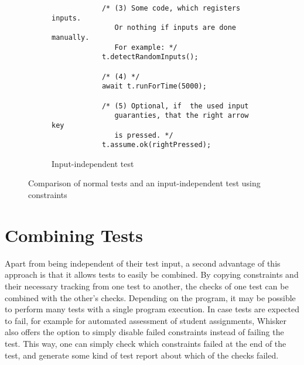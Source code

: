 \begin{figure}[h]
\begin{subfigure}[b]{.47\textwidth}
\begin{verbatim}
            /* (3) Some code, which registers inputs.
               Or nothing if inputs are done manually.
               For example: */
            t.detectRandomInputs();

            /* (4) */
            await t.runForTime(5000);

            /* (5) Optional, if  the used input
               guaranties, that the right arrow key
               is pressed. */
            t.assume.ok(rightPressed);
        \end{verbatim}
        \caption{Input-independent test}
    \end{subfigure}
    \caption{Comparison of normal tests and an input-independent test using constraints}
    \label{fig:normal-input-independet-test-comparison}
\end{figure}

\section{Combining Tests}

Apart from being independent of their test input, a second advantage of this approach is that it allows tests to easily be combined.
By copying constraints and their necessary tracking from one test to another, the checks of one test can be combined with the other's checks.
Depending on the program, it may be possible to perform many tests with a single program execution.
In case tests are expected to fail, for example for automated assessment of student assignments,
Whisker also offers the option to simply disable failed constraints instead of failing the test.
This way, one can simply check which constraints failed at the end of the test, and generate some kind of test report about which of the checks failed.


